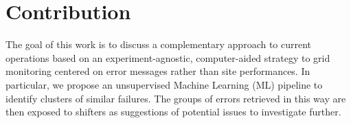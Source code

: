 \section{Contribution}
The goal of this work is to discuss a complementary approach to current operations based on an experiment-agnostic, computer-aided strategy to grid monitoring centered on error messages rather than site performances.
In particular, we propose an unsupervised Machine Learning (ML) pipeline to identify clusters of similar failures. The groups of errors retrieved in this way are then exposed to shifters as suggestions of potential issues to investigate further.
